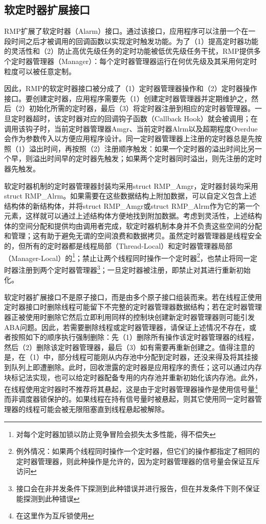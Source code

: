 \subsection{软定时器扩展接口}\label{subsec:soft-timer-extension-interface}

RMP扩展了软定时器（Alarm）接口。通过该接口，应用程序可以注册一个在一段时间之后才被调用的回调函数以实现定时触发功能。为了（1）提高定时器功能的灵活性和（2）防止高优先级任务的定时功能被低优先级任务干扰，RMP提供多个定时器管理器（Manager）：每个定时器管理器运行在何优先级及其采用何定时粒度可以被任意定制。

因此，RMP的软定时器接口被分成了（1）定时器管理器操作和（2）定时器操作接口。要创建定时器，应用程序需要先（1）创建定时器管理器并定期维护之，然后（2）初始化所需的定时器，最后（3）将定时器注册到相应的定时器管理器。一旦定时器超时，该定时器对应的回调钩子函数（Callback
Hook）就会被调用；在调用该钩子时，当前定时器管理器Amgr、当前定时器Alrm以及超期程度Overdue会作为参数传入以方便应用程序设计。同一定时器管理器上注册的定时器总是先按照（1）溢出时间，再按照（2）注册顺序触发：如果一个定时器的溢出时间比另一个早，则溢出时间早的定时器先触发；如果两个定时器同时溢出，则先注册的定时器先触发。

软定时器机制的定时器管理器封装均采用struct
RMP\_Amgr，定时器封装均采用struct
RMP\_Alrm。如果需要在这些数据结构上附加数据，可以自定义包含上述结构体的新结构体，并将struct
RMP\_Amgr或struct
RMP\_Alrm作为它的第一个元素，这样就可以通过上述结构体方便地找到附加数据。考虑到灵活性，上述结构体的空间分配和提供均由调用者完成，软定时器机制本身并不负责这些空间的分配和管理；这有助于避免无谓的空间浪费和数据拷贝。虽然定时器管理器是线程安全的，但所有的定时器都是线程局部（Thread-Local）和定时器管理器局部（Manager-Local）的\footnote{对每个定时器加锁以防止竞争冒险会损失太多性能，得不偿失}；禁止让两个线程同时操作一个定时器\footnote{例外情况：如果两个线程同时操作一个定时器，但它们的操作都指定了相同的定时器管理器，则此种操作是允许的，因为定时器管理器的信号量会保证互斥访问}，也禁止将同一定时器注册到两个定时器管理器\footnote{接口会在非并发条件下探测到此种错误并进行报告，但在并发条件下则不保证能探测到此种错误}；一旦定时器被注册，即禁止对其进行重新初始化。

软定时器扩展接口不是原子接口，而是由多个原子接口组装而来。若在线程正使用定时器接口时删除线程可能留下不完整的定时器管理器数据结构；若在定时器管理器正被使用时删除它然后立即利用同样的控制块创建新定时器管理器则可能引发ABA问题。因此，若需要删除线程或定时器管理器，请保证上述情况不存在，或者按照如下的顺序执行强制删除：先（1）删除所有操作该定时器管理器的线程，然后（2）删除该定时器管理器，最后（3）如有需要再重新创建之。值得注意的是，在（1）中，部分线程可能刚从内存池中分配到定时器，还没来得及将其挂接到队列上即遭删除。此时，回收泄露的定时器是应用程序的责任；这可以通过内存块标记法实现，也可以给定时器配备专用的内存池并重新初始化该内存池。此外，在线程使用定时器时不推荐将其悬起，这是由于定时器管理器操作是使用信号量\footnote{在这里作为互斥锁使用}而非调度器锁保护的。如果线程在持有信号量时被悬起，则其它使用同一定时器管理器的线程可能会被无限阻塞直到线程悬起被解除。

